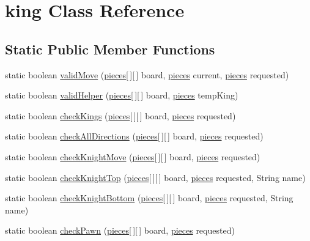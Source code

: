 \hypertarget{classking}{\section{king Class Reference}
\label{classking}
}
\subsection*{Static Public Member Functions}
\begin{DoxyCompactItemize}
\item 
static boolean \hyperlink{classking_ab7d82f2e4477fd7212c03395cdba10b2}{valid\-Move} (\hyperlink{classpieces}{pieces}\mbox{[}$\,$\mbox{]}\mbox{[}$\,$\mbox{]} board, \hyperlink{classpieces}{pieces} current, \hyperlink{classpieces}{pieces} requested)
\item 
static boolean \hyperlink{classking_a9975add6d58679c6e01dc08d98f725ce}{valid\-Helper} (\hyperlink{classpieces}{pieces}\mbox{[}$\,$\mbox{]}\mbox{[}$\,$\mbox{]} board, \hyperlink{classpieces}{pieces} temp\-King)
\item 
static boolean \hyperlink{classking_acadf7bd5502858fe4b9924bb16ef3dfc}{check\-Kings} (\hyperlink{classpieces}{pieces}\mbox{[}$\,$\mbox{]}\mbox{[}$\,$\mbox{]} board, \hyperlink{classpieces}{pieces} requested)
\item 
static boolean \hyperlink{classking_ab1b9aa117fb9055e0cbb34769d6a35f8}{check\-All\-Directions} (\hyperlink{classpieces}{pieces}\mbox{[}$\,$\mbox{]}\mbox{[}$\,$\mbox{]} board, \hyperlink{classpieces}{pieces} requested)
\item 
static boolean \hyperlink{classking_a7bbf661b8eeb9eb5fdf7fc44588df3ef}{check\-Knight\-Move} (\hyperlink{classpieces}{pieces}\mbox{[}$\,$\mbox{]}\mbox{[}$\,$\mbox{]} board, \hyperlink{classpieces}{pieces} requested)
\item 
static boolean \hyperlink{classking_a395655d319b7c896e9fe66aa2c0e6022}{check\-Knight\-Top} (\hyperlink{classpieces}{pieces}\mbox{[}$\,$\mbox{]}\mbox{[}$\,$\mbox{]} board, \hyperlink{classpieces}{pieces} requested, String name)
\item 
static boolean \hyperlink{classking_ac22ef87ee45aa848e19bde6621f5168e}{check\-Knight\-Bottom} (\hyperlink{classpieces}{pieces}\mbox{[}$\,$\mbox{]}\mbox{[}$\,$\mbox{]} board, \hyperlink{classpieces}{pieces} requested, String name)
\item 
static boolean \hyperlink{classking_a3ccdb48365dd8c050869f8fb2bcdc857}{check\-Pawn} (\hyperlink{classpieces}{pieces}\mbox{[}$\,$\mbox{]}\mbox{[}$\,$\mbox{]} board, \hyperlink{classpieces}{pieces} requested)
\end{DoxyCompactItemize}


